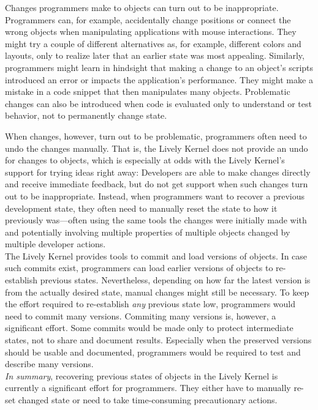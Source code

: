 Changes programmers make to objects can turn out to be inappropriate.
Programmers can, for example, accidentally change positions or connect the wrong objects when manipulating applications with mouse interactions.
They might try a couple of different alternatives as, for example, different colors and layouts, only to realize later that an earlier state was most appealing.
Similarly, programmers might learn in hindsight that making a change to an object's scripts introduced an error or impacts the application's performance.
They might make a mistake in a code snippet that then manipulates many objects.
Problematic changes can also be introduced when code is evaluated only to understand or test behavior, not to permanently change state.

When changes, however, turn out to be problematic, programmers often need to undo the changes manually.
That is, the Lively Kernel does not provide an undo for changes to objects, which is especially at odds with the Lively Kernel's support for trying ideas right away: Developers are able to make changes directly and receive immediate feedback, but do not get support when such changes turn out to be inappropriate.
Instead, when programmers want to recover a previous development state, they often need to manually reset the state to how it previously was---often using the same tools the changes were initially made with and potentially involving multiple properties of multiple objects changed by multiple developer actions.\\
The Lively Kernel provides tools to commit and load versions of objects.
In case such commits exist, programmers can load earlier versions of objects to re-establish previous states.
Nevertheless, depending on how far the latest version is from the actually desired state, manual changes might still be necessary.
To keep the effort required to re-establish \emph{any} previous state low, programmers would need to commit many versions.
Commiting many versions is, however, a significant effort.
Some commits would be made only to protect intermediate states, not to share and document results.
Especially when the preserved versions should be usable and documented, programmers would be required to test and describe many versions.\\
\emph{In summary}, recovering previous states of objects in the Lively Kernel is currently a significant effort for programmers.
They either have to manually re-set changed state or need to take time-consuming precautionary actions.

